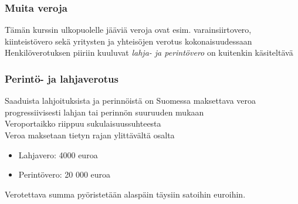 \documentclass{beamer}
\newcommand{\pblock}{\\ \vspace{0.5cm}\pause}
\begin{document}
\begin{frame}
\frametitle{Muita veroja}
\pause
Tämän kurssin ulkopuolelle jääviä veroja ovat esim. varainsiirtovero,  kiinteistövero sekä yritysten ja yhteisöjen verotus kokonaisuudessaan
\pblock
Henkilöverotuksen piiriin kuuluvat \emph{lahja- ja perintövero} on kuitenkin käsiteltävä


\end{frame}

\begin{frame}
	\frametitle{Perintö- ja lahjaverotus}
	\pause
	Saaduista lahjoituksista ja perinnöistä on Suomessa maksettava veroa progressiivisesti lahjan tai perinnön suuruuden mukaan
	\pblock
	Veroportaikko riippuu sukulaisuussuhteesta
	\pblock
	Veroa maksetaan tietyn rajan ylittävältä osalta
	\begin{itemize}
		\item Lahjavero: 4000 euroa
		\item Perintövero: 20 000 euroa
	\pblock
	\end{itemize}
	
	Verotettava summa pyöristetään alaspäin täysiin satoihin euroihin.
\end{frame}
\end{document}
